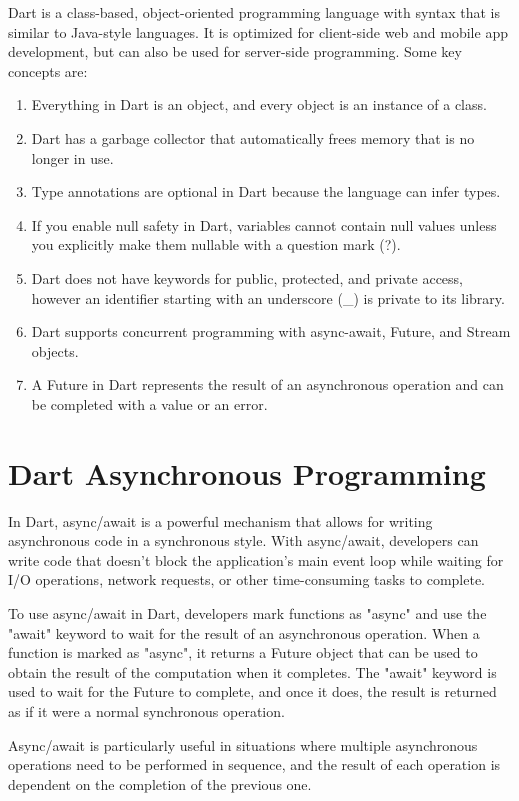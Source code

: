 \documentclass[conference]{IEEEtran}
\begin{document}
Dart is a class-based, object-oriented programming language with syntax that is similar to Java-style languages. It is optimized for client-side web and mobile app development, but can also be used for server-side programming. Some key concepts are:

\begin{enumerate}
	\item Everything in Dart is an object, and every object is an instance of a class.
	\item Dart has a garbage collector that automatically frees memory that is no longer in use. 
	\item Type annotations are optional in Dart because the language can infer types.
	\item If you enable null safety in Dart, variables cannot contain null values unless you explicitly make them nullable with a question mark (?).
	\item Dart does not have keywords for public, protected, and private access, however an identifier starting with an underscore (\_) is private to its library.
	\item Dart supports concurrent programming with async-await, Future, and Stream objects.
	\item A Future in Dart represents the result of an asynchronous operation and can be completed with a value or an error.
\end{enumerate}

\section{Dart Asynchronous Programming}
In Dart, async/await is a powerful mechanism that allows for writing asynchronous code in a synchronous style. With async/await, developers can write code that doesn't block the application's main event loop while waiting for I/O operations, network requests, or other time-consuming tasks to complete.

To use async/await in Dart, developers mark functions as "async" and use the "await" keyword to wait for the result of an asynchronous operation. When a function is marked as "async", it returns a Future object that can be used to obtain the result of the computation when it completes. The "await" keyword is used to wait for the Future to complete, and once it does, the result is returned as if it were a normal synchronous operation.

Async/await is particularly useful in situations where multiple asynchronous operations need to be performed in sequence, and the result of each operation is dependent on the completion of the previous one. 
\end{document}
